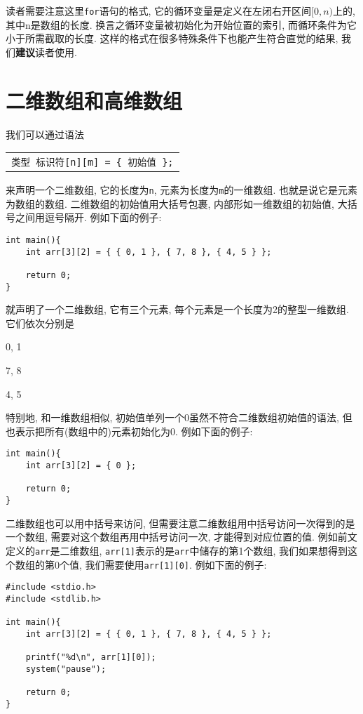         读者需要注意这里\texttt{for}语句的格式, 它的循环变量是定义在左闭右开区间$[0, n)$上的, 其中n是数组的长度. 换言之循环变量被初始化为开始位置的索引, 而循环条件为它小于所需截取的长度. 这样的格式在很多特殊条件下也能产生符合直觉的结果, 我们\textbf{建议}读者使用.

    \section{二维数组和高维数组}
        我们可以通过语法
            \begin{center}
            \begin{longtable}{l}
                \texttt{类型~标识符\hspace*{-0.25pt}[n][m] = \{ 初始值 \};}
            \end{longtable}
            \end{center}
        来声明一个二维数组, 它的长度为\texttt{n}, 元素为长度为\texttt{m}的一维数组. 也就是说它是元素为数组的数组. 二维数组的初始值用大括号包裹, 内部形如一维数组的初始值, 大括号之间用逗号隔开. 例如下面的例子:
\begin{lstlisting}
int main(){
    int arr[3][2] = { { 0, 1 }, { 7, 8 }, { 4, 5 } };

    return 0;
}
\end{lstlisting}

        就声明了一个二维数组, 它有三个元素, 每个元素是一个长度为2的整型一维数组. 它们依次分别是

        0, 1

        7, 8

        4, 5

        特别地, 和一维数组相似, 初始值单列一个0虽然不符合二维数组初始值的语法, 但也表示把所有(数组中的)元素初始化为0. 例如下面的例子:
\begin{lstlisting}
int main(){
    int arr[3][2] = { 0 };

    return 0;
}
\end{lstlisting}

        二维数组也可以用中括号来访问, 但需要注意二维数组用中括号访问一次得到的是一个数组, 需要对这个数组再用中括号访问一次, 才能得到对应位置的值. 例如前文定义的\texttt{arr}是二维数组, \texttt{arr[1]}表示的是\texttt{arr}中储存的第1个数组, 我们如果想得到这个数组的第0个值, 我们需要使用\texttt{arr[1][0]}. 例如下面的例子:
\begin{lstlisting}
#include <stdio.h>
#include <stdlib.h>

int main(){
    int arr[3][2] = { { 0, 1 }, { 7, 8 }, { 4, 5 } };

    printf("%d\n", arr[1][0]);
    system("pause");

    return 0;
}
\end{lstlisting}

